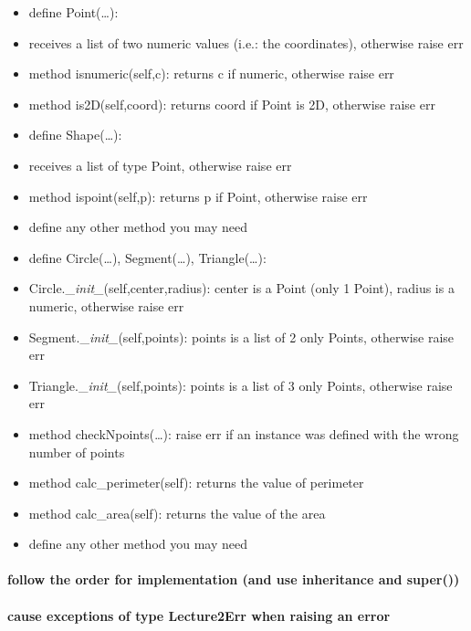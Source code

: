 \documentclass[11pt]{article}
\providecommand{\tightlist}{%
      \setlength{\itemsep}{0pt}\setlength{\parskip}{0pt}}
\begin{document}
\begin{itemize}
\tightlist
\item
  define Point(\ldots):
\item
  receives a list of two numeric values (i.e.: the coordinates),
  otherwise raise err
\item
  method isnumeric(self,c): returns c if numeric, otherwise raise err
\item
  method is2D(self,coord): returns coord if Point is 2D, otherwise raise
  err
\item
  define Shape(\ldots):
\item
  receives a list of type Point, otherwise raise err
\item
  method ispoint(self,p): returns p if Point, otherwise raise err
\item
  define any other method you may need
\item
  define Circle(\ldots), Segment(\ldots), Triangle(\ldots):
\item
  Circle.\_\emph{init\_}(self,center,radius): center is a Point (only 1
  Point), radius is a numeric, otherwise raise err
\item
  Segment.\_\emph{init\_}(self,points): points is a list of 2 only
  Points, otherwise raise err
\item
  Triangle.\_\emph{init\_}(self,points): points is a list of 3 only
  Points, otherwise raise err
\item
  method checkNpoints(\ldots): raise err if an instance was defined with
  the wrong number of points
\item
  method calc\_perimeter(self): returns the value of perimeter
\item
  method calc\_area(self): returns the value of the area
\item
  define any other method you may need
\end{itemize}

\hypertarget{follow-the-order-for-implementation-and-use-inheritance-and-super}{%
\paragraph{follow the order for implementation (and use inheritance and
super())}\label{follow-the-order-for-implementation-and-use-inheritance-and-super}}

\hypertarget{cause-exceptions-of-type-lecture2err-when-raising-an-error}{%
\paragraph{cause exceptions of type Lecture2Err when raising an
error}\label{cause-exceptions-of-type-lecture2err-when-raising-an-error}}
\end{document}

